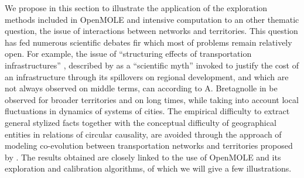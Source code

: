 \documentclass[10pt]{article}
\begin{document}
We propose in this section to illustrate the application of the exploration methods included in OpenMOLE and intensive computation to an other thematic question, the issue of interactions between networks and territories. This question has fed numerous scientific debates fir which most of problems remain relatively open. For example, the issue of ``structuring effects of transportation infrastructures'' \citep{bonnafous1974methodologies}, described by \cite{offner1993effets} as a ``scientific myth'' invoked to justify the cost of an infrastructure through its spillovers on regional development, and which are not always observed on middle terms, can according to A. Bretagnolle in \citep{offner2014effets} be observed for broader territories and on long times, while taking into account local fluctuations in dynamics of systems of cities. The empirical difficulty to extract general stylized facts together with the conceptual difficulty of geographical entities in relations of circular causality, are avoided through the approach of modeling co-evolution between transportation networks and territories proposed by \cite{raimbault2018modelisation}. The results obtained are closely linked to the use of OpenMOLE and its exploration and calibration algorithms, of which we will give a few illustrations.
\end{document}

